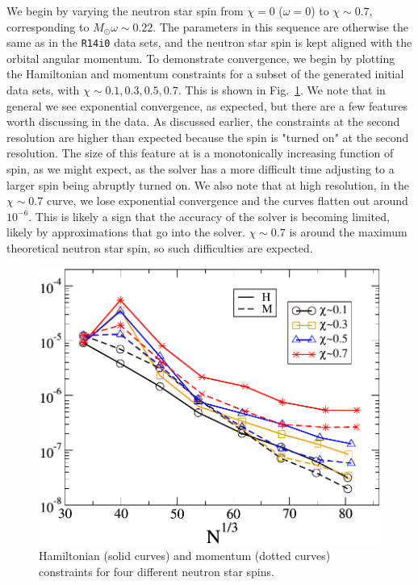 We begin by
varying the neutron star spin from $\chi=0$ ($\omega=0$) to $\chi\sim0.7$,
corresponding to $M_{\odot}\omega\sim0.22$. The parameters in this
sequence are otherwise the same as in the {\tt R14i0} data sets, and the neutron star spin is kept aligned with the orbital
angular momentum. To demonstrate convergence, we begin by plotting the
Hamiltonian and momentum constraints for a subset of the generated
initial data sets, with $\chi\sim{0.1,0.3,0.5,0.7}$. This is shown in
Fig.~\ref{fig:OmegaSeqHamMom}. We note that in general we see
exponential convergence, as expected, but there are a few features
worth discussing in the data.
As discussed earlier, the constraints at the second resolution are higher than expected because the spin is "turned on" at the second resolution.
The size of this feature at is a monotonically increasing function of spin, as we might
expect, as the solver has a more difficult time adjusting to a larger spin being abruptly turned on. We also note that at high resolution, in
the $\chi\sim 0.7$ curve, we lose exponential convergence and the
curves flatten out around $10^{-6}$.  This is likely a sign that the accuracy of the
solver is becoming limited, likely by approximations that go into the
solver. $\chi\sim 0.7$ is around the maximum theoretical neutron star
spin, so such difficulties are expected.

\begin{figure}
\includegraphics[width=0.95\columnwidth]{chap4/OmegaSeqHamMom}
\caption[Constraints for the $\chi_{\rm NS}$ sequence.]{\label{fig:OmegaSeqHamMom} Hamiltonian (solid curves) and
momentum (dotted curves) constraints for four different neutron star spins.}
\end{figure}

